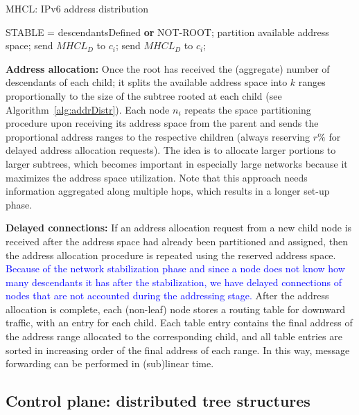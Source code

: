 \begin{algorithm}[!t]
\caption{MHCL: IPv6 address distribution}\label{alg:addrDistr}
\begin{algorithmic}[1]
 \State STABLE = descendantsDefined \textbf{or} NOT-ROOT;
      \State partition available address space;
        \State send $MHCL_{D}$ to $c_i$; 
            \State send $MHCL_{D}$ to $c_i$; 
        \EndIf
      \EndFor
  \EndIf
\end{algorithmic}
\end{algorithm}

\textbf{Address allocation:} Once the root has received the (aggregate) number of descendants of each child; it splits the available address space into $k$ ranges proportionally to the size of the subtree rooted at each child (see Algorithm~\ref{alg:addrDistr}). Each node $n_i$ repeats the space partitioning procedure upon receiving its address space from the parent and sends the proportional address ranges to the respective children (always reserving $r\%$ for delayed address allocation requests). The idea is to allocate larger portions to larger subtrees, which becomes important in especially large networks because it maximizes the address space utilization. Note that this approach needs information aggregated along multiple hops, which results in a longer set-up phase.

\textbf{Delayed connections:} If an address allocation request from a new child node is received after the address space had already been partitioned and assigned, then the address allocation procedure is repeated using the reserved address space.
\textcolor{blue}{Because of the network stabilization phase and since a node does not know how many descendants it has after the stabilization, we have delayed connections of nodes that are not accounted during the addressing stage.} After the address allocation is complete, each (non-leaf) node stores a routing table for downward traffic, with an entry for each child. Each table entry contains the final address of the address range allocated to the corresponding child, and all table entries are sorted in increasing order of the final address of each range. In this way, message forwarding can be performed in (sub)linear time.

\subsection{Control plane: distributed tree structures}

